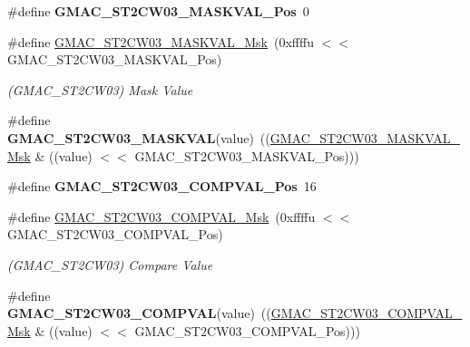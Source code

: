 \begin{DoxyCompactItemize}
\#define {\bfseries G\+M\+A\+C\+\_\+\+S\+T2\+C\+W03\+\_\+\+M\+A\+S\+K\+V\+A\+L\+\_\+\+Pos}~0
\item 
\mbox{\label{group__SAME70__GMAC_ga7228ea6adf3e3cef3fc3d09348dbc7ee}} 
\#define \mbox{\hyperlink{group__SAME70__GMAC_ga7228ea6adf3e3cef3fc3d09348dbc7ee}{G\+M\+A\+C\+\_\+\+S\+T2\+C\+W03\+\_\+\+M\+A\+S\+K\+V\+A\+L\+\_\+\+Msk}}~(0xffffu $<$$<$ G\+M\+A\+C\+\_\+\+S\+T2\+C\+W03\+\_\+\+M\+A\+S\+K\+V\+A\+L\+\_\+\+Pos)
\begin{DoxyCompactList}\small\item\em (G\+M\+A\+C\+\_\+\+S\+T2\+C\+W03) Mask Value \end{DoxyCompactList}\item 
\mbox{\label{group__SAME70__GMAC_ga2f42f547c01f225d9b63ad2f709aef90}} 
\#define {\bfseries G\+M\+A\+C\+\_\+\+S\+T2\+C\+W03\+\_\+\+M\+A\+S\+K\+V\+AL}(value)~((\mbox{\hyperlink{group__SAMV71__GMAC_ga7228ea6adf3e3cef3fc3d09348dbc7ee}{G\+M\+A\+C\+\_\+\+S\+T2\+C\+W03\+\_\+\+M\+A\+S\+K\+V\+A\+L\+\_\+\+Msk}} \& ((value) $<$$<$ G\+M\+A\+C\+\_\+\+S\+T2\+C\+W03\+\_\+\+M\+A\+S\+K\+V\+A\+L\+\_\+\+Pos)))
\item 
\mbox{\label{group__SAME70__GMAC_gac0bee466ac3f7f8bc4d583ba44f76a7f}} 
\#define {\bfseries G\+M\+A\+C\+\_\+\+S\+T2\+C\+W03\+\_\+\+C\+O\+M\+P\+V\+A\+L\+\_\+\+Pos}~16
\item 
\mbox{\label{group__SAME70__GMAC_gabe7cf1cd012940de7c9c4ba36148dfe0}} 
\#define \mbox{\hyperlink{group__SAME70__GMAC_gabe7cf1cd012940de7c9c4ba36148dfe0}{G\+M\+A\+C\+\_\+\+S\+T2\+C\+W03\+\_\+\+C\+O\+M\+P\+V\+A\+L\+\_\+\+Msk}}~(0xffffu $<$$<$ G\+M\+A\+C\+\_\+\+S\+T2\+C\+W03\+\_\+\+C\+O\+M\+P\+V\+A\+L\+\_\+\+Pos)
\begin{DoxyCompactList}\small\item\em (G\+M\+A\+C\+\_\+\+S\+T2\+C\+W03) Compare Value \end{DoxyCompactList}\item 
\mbox{\label{group__SAME70__GMAC_gaefc0d7392441de4dd7ed820efebb0543}} 
\#define {\bfseries G\+M\+A\+C\+\_\+\+S\+T2\+C\+W03\+\_\+\+C\+O\+M\+P\+V\+AL}(value)~((\mbox{\hyperlink{group__SAMV71__GMAC_gabe7cf1cd012940de7c9c4ba36148dfe0}{G\+M\+A\+C\+\_\+\+S\+T2\+C\+W03\+\_\+\+C\+O\+M\+P\+V\+A\+L\+\_\+\+Msk}} \& ((value) $<$$<$ G\+M\+A\+C\+\_\+\+S\+T2\+C\+W03\+\_\+\+C\+O\+M\+P\+V\+A\+L\+\_\+\+Pos)))

\end{DoxyCompactItemize}
